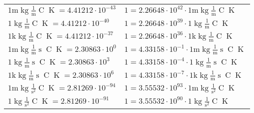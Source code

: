 \begin{center}
\begin{longtable}{l l}
{\color{gray}$1 \bm{\mathrm{ m}}\operatorname{kg}\frac1{\operatorname{m}}{}{\operatorname{C}}{\operatorname{K}} = 4.41212\cdot10^{-43} $}   & {\color{gray}$ 1 = 2.26648\cdot10^{42} \cdot 1 \bm{\mathrm{ m}}\operatorname{kg}\frac1{\operatorname{m}}{}{\operatorname{C}}{\operatorname{K}}$}  \\
{\color{black}$1 \bm{\mathrm{ }}\operatorname{kg}\frac1{\operatorname{m}}{}{\operatorname{C}}{\operatorname{K}} = 4.41212\cdot10^{-40} $}   & {\color{black}$ 1 = 2.26648\cdot10^{39} \cdot 1 \bm{\mathrm{ }}\operatorname{kg}\frac1{\operatorname{m}}{}{\operatorname{C}}{\operatorname{K}}$}  \\
{\color{gray}$1 \bm{\mathrm{ k}}\operatorname{kg}\frac1{\operatorname{m}}{}{\operatorname{C}}{\operatorname{K}} = 4.41212\cdot10^{-37} $}   & {\color{gray}$ 1 = 2.26648\cdot10^{36} \cdot 1 \bm{\mathrm{ k}}\operatorname{kg}\frac1{\operatorname{m}}{}{\operatorname{C}}{\operatorname{K}}$}  \\
{\color{gray}$1 \bm{\mathrm{ m}}\operatorname{kg}\frac1{\operatorname{m}}{\operatorname{s}}{\operatorname{C}}{\operatorname{K}} = 2.30863\cdot10^{0} $}   & {\color{gray}$ 1 = 4.33158\cdot10^{-1} \cdot 1 \bm{\mathrm{ m}}\operatorname{kg}\frac1{\operatorname{m}}{\operatorname{s}}{\operatorname{C}}{\operatorname{K}}$}  \\
{\color{black}$1 \bm{\mathrm{ }}\operatorname{kg}\frac1{\operatorname{m}}{\operatorname{s}}{\operatorname{C}}{\operatorname{K}} = 2.30863\cdot10^{3} $}   & {\color{black}$ 1 = 4.33158\cdot10^{-4} \cdot 1 \bm{\mathrm{ }}\operatorname{kg}\frac1{\operatorname{m}}{\operatorname{s}}{\operatorname{C}}{\operatorname{K}}$}  \\
{\color{gray}$1 \bm{\mathrm{ k}}\operatorname{kg}\frac1{\operatorname{m}}{\operatorname{s}}{\operatorname{C}}{\operatorname{K}} = 2.30863\cdot10^{6} $}   & {\color{gray}$ 1 = 4.33158\cdot10^{-7} \cdot 1 \bm{\mathrm{ k}}\operatorname{kg}\frac1{\operatorname{m}}{\operatorname{s}}{\operatorname{C}}{\operatorname{K}}$}  \\
{\color{gray}$1 \bm{\mathrm{ m}}\operatorname{kg}{}\frac1{\operatorname{s}^2}{\operatorname{C}}{\operatorname{K}} = 2.81269\cdot10^{-94} $}   & {\color{gray}$ 1 = 3.55532\cdot10^{93} \cdot 1 \bm{\mathrm{ m}}\operatorname{kg}{}\frac1{\operatorname{s}^2}{\operatorname{C}}{\operatorname{K}}$}  \\
{\color{black}$1 \bm{\mathrm{ }}\operatorname{kg}{}\frac1{\operatorname{s}^2}{\operatorname{C}}{\operatorname{K}} = 2.81269\cdot10^{-91} $}   & {\color{black}$ 1 = 3.55532\cdot10^{90} \cdot 1 \bm{\mathrm{ }}\operatorname{kg}{}\frac1{\operatorname{s}^2}{\operatorname{C}}{\operatorname{K}}$}  \\

\end{longtable}
\end{center}
